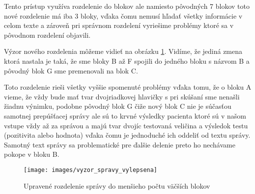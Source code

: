 Tento prístup využíva rozdelenie do blokov ale namiesto pôvodných 7 blokov toto nové rozdelenie má iba 3 bloky, vďaka čomu nemusí hľadať všetky informácie v celom texte a zároveň pri správnom rozdelení vyriešime problémy ktoré sa v pôvodnom rozdelení objavili. 

Výzor nového rozdelenia môžeme vidieť na obrázku \ref{obr:sprava_uprava}. Vidíme, že jediná zmena ktorá nastala je taká, že sme bloky B až F spojili do jedného bloku s názvom B a pôvodný blok G sme premenovali na blok C. 

Toto rozdelenie rieši všetky vyššie spomenuté problémy vďaka tomu, že o bloku A vieme, že vždy bude mať tvar dvojriadkovej hlavičky s pri skúšaní sme nenašli žiadnu výnimku, podobne pôvodný blok G čiže nový blok C nie je súčasťou samotnej prepúšťacej správy ale sú to krvné výsledky pacienta ktoré sú v našom vstupe vždy až za správou a majú tvar dvojíc testovaná veličina a výsledok testu (pozitivita alebo hodnota) vďaka čomu je jednoduché ich oddeliť od textu správy. Samotný text správy sa problematické pre ďalšie delenie preto ho nechávame pokope v bloku B.

\begin{figure}
	\centerline{\texttt{[image: images/vyzor\_spravy\_vylepsena]}}
	\caption[Upravené rozloženie správy]{Upravené rozdelenie správy do menšieho počtu väčších blokov}
	\label{obr:sprava_uprava}
\end{figure}
   